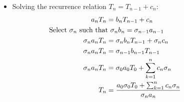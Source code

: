 \documentclass{article}
\begin{document}
\begin{itemize}
	\item Solving the recurrence relation $T_n = T_{n-1} + c_n$:
	\begin{align*}
		a_n T_n &= b_n T_{n-1} + c_n\\
		\mathclap{\text{Select $\sigma_n$ such that } \sigma_n b_n = \sigma_{n-1} a_{n-1}}\\
		\sigma_n a_n T_n &= \sigma_n b_n T_{n-1} + \sigma_n c_n \\
		\sigma_n a_n T_n &= \sigma_{n-1} b_{n-1} T_{n-1}\\
		\sigma_n a_n T_n &= \sigma_0 a_0 T_0 + \sum_{k=1}^n c_n \sigma_n\\
				T_n &= \frac{ a_0 \sigma_0 T_0 + \sum_{k=1}^n c_n \sigma_n}{\sigma_n a_n} 
	\end{align*}

	\end{itemize}
\end{document}
